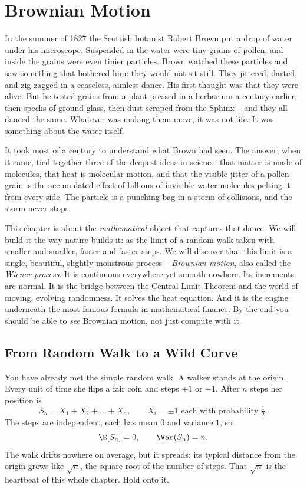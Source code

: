 \chapter{Brownian Motion}

In the summer of 1827 the Scottish botanist Robert Brown put a drop of water
under his microscope. Suspended in the water were tiny grains of pollen, and
inside the grains were even tinier particles. Brown watched these particles and
saw something that bothered him: they would not sit still. They jittered, darted,
and zig-zagged in a ceaseless, aimless dance. His first thought was that they
were alive. But he tested grains from a plant pressed in a herbarium a century
earlier, then specks of ground glass, then dust scraped from the Sphinx -- and
they all danced the same. Whatever was making them move, it was not life. It was
something about the water itself.

It took most of a century to understand what Brown had seen. The answer, when it
came, tied together three of the deepest ideas in science: that matter is made of
molecules, that heat is molecular motion, and that the visible jitter of a pollen
grain is the accumulated effect of billions of invisible water molecules pelting
it from every side. The particle is a punching bag in a storm of collisions, and
the storm never stops.

This chapter is about the \emph{mathematical} object that captures that dance. We
will build it the way nature builds it: as the limit of a random walk taken with
smaller and smaller, faster and faster steps. We will discover that this limit is
a single, beautiful, slightly monstrous process -- \emph{Brownian motion}, also
called the \emph{Wiener process}. It is continuous everywhere yet smooth nowhere.
Its increments are normal. It is the bridge between the Central Limit Theorem and
the world of moving, evolving randomness. It solves the heat equation. And it is
the engine underneath the most famous formula in mathematical finance. By the end
you should be able to \emph{see} Brownian motion, not just compute with it.

\chapterline

\section{From Random Walk to a Wild Curve}
\label{ch29:walk-to-curve}

You have already met the simple random walk. A walker stands at the origin. Every
unit of time she flips a fair coin and steps $+1$ or $-1$. After $n$ steps her
position is
\[
  S_n = X_1 + X_2 + \dots + X_n,
  \qquad X_i = \pm 1 \text{ each with probability } \tfrac12.
\]
The steps are independent, each has mean $0$ and variance $1$, so
\[
  \E[S_n] = 0, \qquad \Var(S_n) = n.
\]
The walk drifts nowhere on average, but it spreads: its typical distance from the
origin grows like $\sqrt{n}$, the square root of the number of steps. That
$\sqrt{n}$ is the heartbeat of this whole chapter. Hold onto it.

